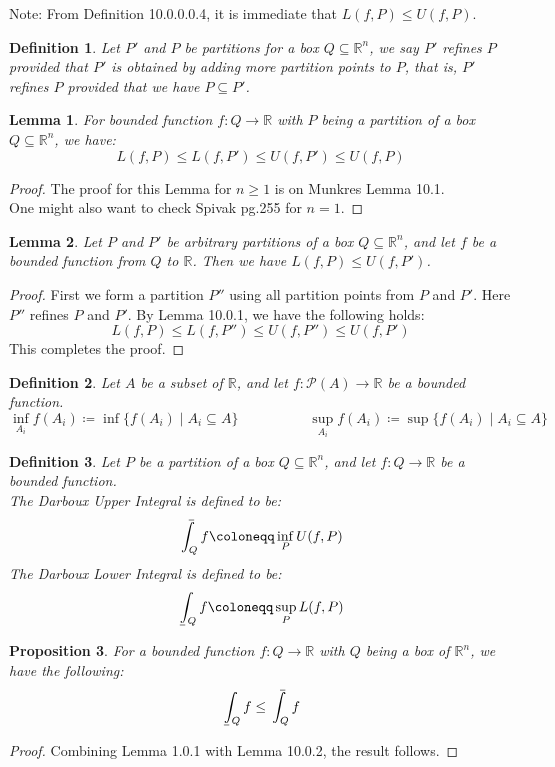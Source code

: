 \documentclass[15pt]{book}
\theoremstyle{break}
\theoremstyle{break}
\newtheorem{lem}{Lemma}[thm]
\newtheorem{prop}[lem]{Proposition}
\newtheorem{defn}{Definition}[corL]
\def\upint{\mathchoice%
    {\mkern13mu\overline{\vphantom{\intop}\mkern7mu}\mkern-20mu}%
    {\mkern7mu\overline{\vphantom{\intop}\mkern7mu}\mkern-14mu}%
    {\mkern7mu\overline{\vphantom{\intop}\mkern7mu}\mkern-14mu}%
    {\mkern7mu\overline{\vphantom{\intop}\mkern7mu}\mkern-14mu}%
  \int}
\def\lowint{\mkern3mu\underline{\vphantom{\intop}\mkern7mu}\mkern-10mu\int}
\newcommand{\R}{\mathbb{R}}
\newcommand{\Power}{\mathcal{P}}
\newcommand{\note}{\color{red}Note: \color{black}}
\begin{document}
\note From Definition 10.0.0.0.4, it is immediate that $L(f,P) \leq U(f,P)$.

\begin{defn}
Let $P'$ and $P$ be partitions for  a box $Q\subseteq \R^n$, we say $P'$ refines $P$ provided that $P'$ is obtained by adding more partition points to $P$, that is, $P'$ refines $P$ provided that we have $P \subseteq P'$.  
\end{defn}


\begin{lem}
For bounded function $f:Q \to \R$ with $P$ being a partition of a box $Q\subseteq \R^n$, we have:
$$L(f,P) \leq L(f,P') \leq U(f,P') \leq U(f,P)$$
\end{lem}
\begin{proof}
The proof for this Lemma for $n\geq 1$ is on Munkres Lemma 10.1.\\ One might also want to check Spivak pg.255 for $n=1$.
\end{proof}

\begin{lem}
Let $P$ and $P'$ be arbitrary partitions of a box $Q\subseteq \R^n$, and let $f$ be a bounded function from $Q$ to $\R$. Then we have $L(f,P) \leq U(f,P')$. 
\end{lem}
\begin{proof}
First we form a partition $P''$ using all partition points from $P$ and $P'$. Here $P''$ refines $P$ and $P'$. By Lemma 10.0.1, we have the following holds: 
$$L(f,P) \leq L(f,P'') \leq U(f,P'') \leq U(f,P')$$
This completes the proof.
\end{proof}


\begin{defn}
Let $A$ be a subset of $\R$, and let $f:\Power(A) \to \R$ be a bounded function.
$$\inf_{A_i} f(A_i) \coloneqq \inf\{f(A_i) \mid A_i \subseteq A\} \quad\qquad\qquad \sup_{A_i} f(A_i) \coloneqq \sup\{f(A_i) \mid A_i \subseteq A\}$$
\end{defn}

\begin{defn}
Let $P$ be a partition of a box $Q \subseteq \R^n$, and let $f:Q \to \R$ be a bounded function.\\
The Darboux Upper Integral is defined to be:
$$\upint_Q f \coloneqq \inf_P U(f,P)$$
The Darboux Lower Integral is defined to be:
$$\lowint_Q f \coloneqq \sup_P L(f,P)$$
\end{defn}
\newpage

\begin{prop}
For a bounded function $f:Q \to \R$ with $Q$ being a box of $\R^n$, we have the following: 
$$\lowint_Q f \leq \upint_Q f$$
\end{prop}
\begin{proof}
Combining Lemma 1.0.1 with Lemma 10.0.2, the result follows.
\end{proof}
\end{document}
